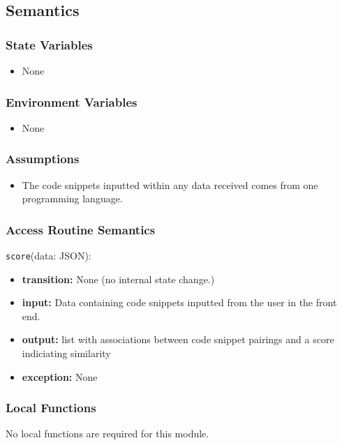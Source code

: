 \documentclass[12pt, titlepage]{article}
\begin{document}
\subsection{Semantics}

\subsubsection{State Variables}

\begin{itemize}
    \item None
\end{itemize}

\subsubsection{Environment Variables}

\begin{itemize}
  \item None
\end{itemize}

\subsubsection{Assumptions}

\begin{itemize}
    \item The code snippets inputted within any data received comes from one programming language.
\end{itemize}

\subsubsection{Access Routine Semantics}
\noindent \texttt{score}(data: JSON):
\begin{itemize}
    \item \textbf{transition:} None (no internal state change.)
    \item \textbf{input:} Data containing code snippets inputted from the user in the front end.
    \item \textbf{output:} list with associations between code snippet pairings and a score indiciating
    similarity
    \item \textbf{exception:} None
\end{itemize}

\subsubsection{Local Functions}
No local functions are required for this module.
\end{document}
